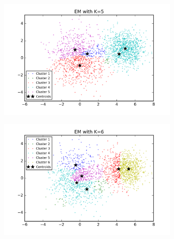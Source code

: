 \begin{description}
\begin{description}
\begin{figure}[!h]
\begin{subfigure}[b]{0.475\textwidth}
        \end{subfigure}
        \begin{subfigure}[b]{0.475\textwidth}  
            \centering 
            \includegraphics[width=\textwidth]{./figures/clustering_EM_5.png}
        \end{subfigure}
        \hfill
        \begin{subfigure}[b]{0.475\textwidth}   
            \centering 
            \includegraphics[width=\textwidth]{./figures/clustering_EM_6.png}
        \end{subfigure}
        \begin{subfigure}[b]{0.475\textwidth}   
            \centering 

\end{subfigure}
\end{figure}
\end{description}
\end{description}
